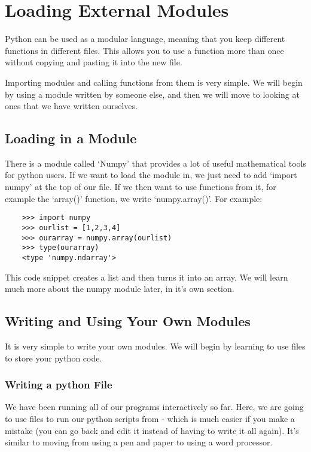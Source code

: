 \section{Loading External Modules}

Python can be used as a modular language, meaning that you keep different
functions in different files. This allows you to use a function more than once
without copying and pasting it into the new file.

Importing modules and calling functions from them is very simple. We will begin
by using a module written by someone else, and then we will move to looking at ones that we have written ourselves.

\subsection{Loading in a Module}

There is a module called `Numpy' that provides a lot of useful mathematical
tools for python users. If we want to load the module in, we just need to add
`import numpy' at the top of our file. If we then want to use functions from it,
for example the `array()' function, we write `numpy.array()'. For example:

\begin{lstlisting}
    >>> import numpy
    >>> ourlist = [1,2,3,4]
    >>> ourarray = numpy.array(ourlist)
    >>> type(ourarray)
    <type 'numpy.ndarray'>
\end{lstlisting}

This code snippet creates a list and then turns it into an array. We will learn
much more about the numpy module later, in it's own section.

\subsection{Writing and Using Your Own Modules}

It is very simple to write your own modules. We will begin by learning to use
files to store your python code.

\subsubsection{Writing a python File}

We have been running all of our programs interactively so far. Here, we are
going to use files to run our python scripts from - which is much easier if you
make a mistake (you can go back and edit it instead of having to write it all
again). It's similar to moving from using a pen and paper to using a word
processor.

